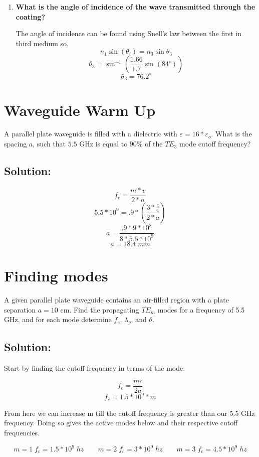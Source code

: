 \documentclass{article}
\begin{document}
\begin{enumerate}[label=(\alph*)]
\begin{enumerate}[label=(\roman*)]
    
        \item \textbf{What is the angle of incidence of the wave transmitted through the coating?}

    The angle of incidence can be found using Snell's law between the first in third medium so,
    $$n_{1}\sin(\theta_{i}) = n_3\sin{\theta_{3}}$$
    $$\theta_{3} = \sin^{-1}(\frac{1.66}{1.7}\sin(84^{\circ}))$$
    $$\boxed{\theta_{3} = 76.2^{\circ}}$$
    \end{enumerate}
\end{enumerate}

\section{Waveguide Warm Up}
A parallel plate waveguide is filled with a dielectric with $\varepsilon=16*\varepsilon_{o}$. What is the spacing $a$, such that $5.5$ GHz is equal to $90\%$ of the $TE_{3}$ mode cutoff frequency?

\subsection{Solution:}

$$f_{c} = \frac{m*v}{2*a}$$
$$5.5*10^{9} = .9*(\frac{3*\frac{c}{4}}{2*a})$$
$$a = \frac{.9*9*10^{8}}{8*5.5*10^{9}}$$
$$\boxed{a = 18.4\; mm}$$

\section{Finding modes}
A given parallel plate waveguide contains an air-filled region with a plate separation $a = 10$ cm. Find the propagating $TE_{m}$ modes for a frequency of 5.5 GHz, and for each mode determine $f_{c}$, $\lambda_{g}$, and $\theta$.

\subsection{Solution:}

Start by finding the cutoff frequency in terms of the mode:

$$f_{c} = \frac{mc}{2a}$$
$$f_{c} = 1.5*10^{9}*m$$

From here we can increase m till the cutoff frequency is greater than our 5.5 GHz frequency. Doing so gives the active modes below and their respective cutoff frequencies.

$$\boxed{m=1\;f_{c}=1.5*10^{9}\;hz \qquad m=2\;f_{c}=3*10^{9}\;hz \qquad m=3\;f_{c}=4.5*10^{9}\;hz}$$
\end{document}
